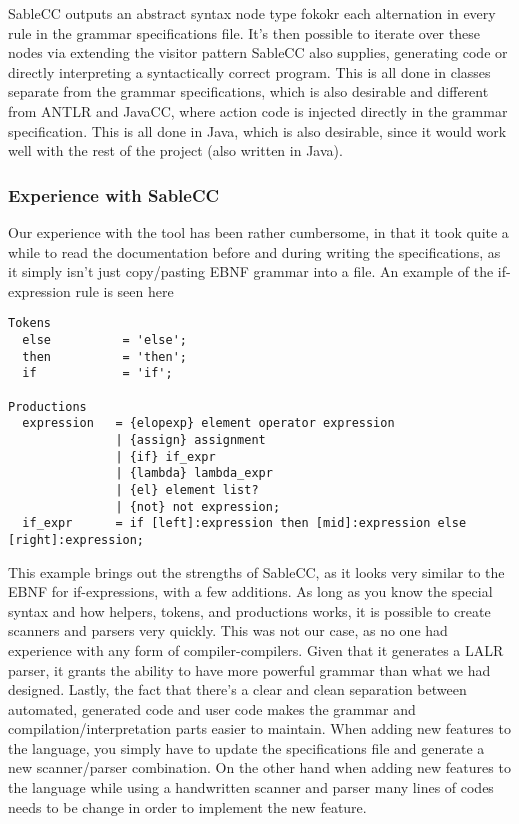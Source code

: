 SableCC outputs an abstract syntax node type fokokr each alternation in
every rule in the grammar specifications file. It's then possible to
iterate over these nodes via extending the visitor pattern SableCC also
supplies, generating code or directly interpreting a syntactically
correct program. This is all done in classes separate from the grammar
specifications, which is also desirable and different from ANTLR
and JavaCC, where action code is injected directly in the grammar
specification. This is all done in Java, which is also desirable, since
it would work well with the rest of the project (also written in Java).

\subsubsection{Experience with SableCC}
Our experience with the tool has been rather cumbersome, in that it took
quite a while to read the documentation before and during writing the
specifications, as it simply isn't just copy/pasting EBNF grammar
into a file. An example of the if-expression rule is seen here

\begin{lstlisting}[caption={Part of the grammar specifications file of SableCC, with focus on if-expressions.}]
Tokens
  else          = 'else';
  then          = 'then';
  if            = 'if';

Productions
  expression   = {elopexp} element operator expression
               | {assign} assignment
               | {if} if_expr
               | {lambda} lambda_expr
               | {el} element list?
               | {not} not expression;
  if_expr      = if [left]:expression then [mid]:expression else [right]:expression;
\end{lstlisting}

This example brings out the strengths of SableCC, as it looks very
similar to the EBNF for if-expressions, with a few additions. As long as
you know the special syntax and how helpers, tokens, and productions works, it
is possible to create scanners and parsers very quickly. This was not
our case, as no one had experience with any form of compiler-compilers.
Given that it generates a LALR parser, it grants the ability to have
more powerful grammar than what we had designed. Lastly, the fact that
there's a clear and clean separation between automated, generated code
and user code makes the grammar and compilation/interpretation parts
easier to maintain. When adding new features to the language, you simply
have to update the specifications file and generate a new scanner/parser
combination. On the other hand when adding new features to the language while
using a handwritten scanner and parser many lines of codes needs to be change
in order to implement the new feature. 

